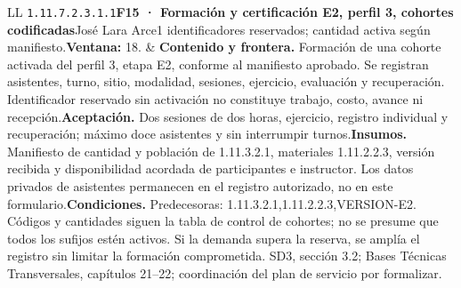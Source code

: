 \begin{longtable}{L{\tabcolsep\relax}L{\tabcolsep\relax}}
\texttt{1.\allowbreak{}11.\allowbreak{}7.\allowbreak{}2.\allowbreak{}3.\allowbreak{}1.\allowbreak{}1}\newline{}\textbf{F15 · Formación y certificación E2, perfil 3, cohortes codificadas}\newline{}José Lara Arce\newline{}1 identificadores reservados; cantidad activa según manifiesto.\newline{}\textbf{Ventana:} 18. & \textbf{Contenido y frontera.} Formación de una cohorte activada del perfil 3, etapa E2, conforme al manifiesto aprobado. Se registran asistentes, turno, sitio, modalidad, sesiones, ejercicio, evaluación y recuperación. Identificador reservado sin activación no constituye trabajo, costo, avance ni recepción.\newline{}\textbf{Aceptación.} Dos sesiones de dos horas, ejercicio, registro individual y recuperación; máximo doce asistentes y sin interrumpir turnos.\newline{}\textbf{Insumos.} Manifiesto de cantidad y población de 1.11.3.2.1, materiales 1.11.2.2.3, versión recibida y disponibilidad acordada de participantes e instructor. Los datos privados de asistentes permanecen en el registro autorizado, no en este formulario.\newline{}\textbf{Condiciones.} Predecesoras: 1.11.3.2.1,1.11.2.2.3,VERSION-E2. Códigos y cantidades siguen la tabla de control de cohortes; no se presume que todos los sufijos estén activos. Si la demanda supera la reserva, se amplía el registro sin limitar la formación comprometida. SD3, sección 3.2; Bases Técnicas Transversales, capítulos 21--22; coordinación del plan de servicio por formalizar.\\\hline

\end{longtable}
